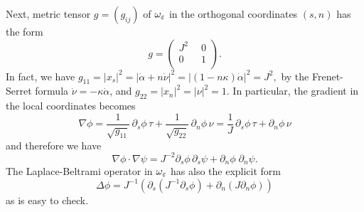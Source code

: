 Next, metric tensor $g=(g_{ij})$ of $\omega_\varepsilon$ in the orthogonal coordinates $(s,n)$  has the form
$$
    g=\left(
        \begin{array}{cc}
          J^2\phantom{0} & 0 \\
          0\phantom{0} & 1\\
        \end{array}
      \right).
$$
In fact, we have
$
g_{11}=|x_s|^2=|\dot{\alpha}+n \dot{\nu}|^2
=|(1-n\kappa) \dot{\alpha}|^2=J^2,
$
by the Frenet-Serret formula $\dot{\nu}=-\kappa \dot{\alpha}$, and $g_{22}=|x_n|^2=|\nu|^2=1$.
In particular,  the gradient in the local coordinates becomes
$$
 \nabla \phi=\frac1{\sqrt{g_{11}}}\,\partial_s\phi\, \tau+\frac1{\sqrt{g_{22}}}\,\partial_n\phi\, \nu=\frac1J\,\partial_s\phi\, \tau+\partial_n\phi\, \nu
$$
and  therefore we have
\begin{equation}\label{ScalarProdGrads}
  \nabla \phi\cdot \nabla \psi=J^{-2}\partial_s\phi\, \partial_s \psi+
\partial_n \phi\; \partial_n \psi.
\end{equation}
The Laplace-Beltrami operator in $\omega_\varepsilon$ has also the explicit form
\begin{equation}\label{LaplacianInSN}
\Delta \phi=J^{-1}\left(\partial_s(J^{-1}\partial_s \phi)+ \partial_n(J\partial_n \phi)\right)
\end{equation}
as is easy to check.
%



